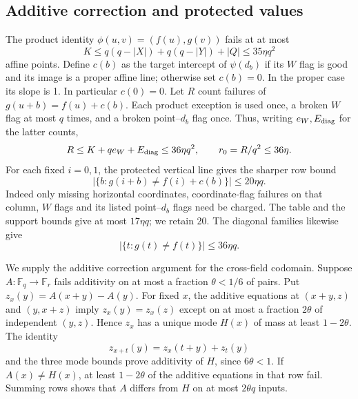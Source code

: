 \documentclass[11pt]{article}
\newcommand{\F}{\mathbb F}
\begin{document}
\subsection{Additive correction and protected values}
The product identity $\phi(u,v)=(f(u),g(v))$ fails at at most
\[
 K\leq q(q-|X|)+q(q-|Y|)+|Q|\leq35\eta q^2
\]
affine points. Define $c(b)$ as the target intercept of $\psi(d_b)$ if
its $W$ flag is good and its image is a proper affine line; otherwise set
$c(b)=0$. In the proper case its slope is 1. In particular $c(0)=0$.
Let $R$ count failures of $g(u+b)=f(u)+c(b)$. Each product exception is
used once, a broken $W$ flag at most $q$ times, and a broken
point--$d_b$ flag once. Thus, writing $e_W,E_{\rm diag}$ for the latter
counts,
\begin{equation}\label{pexidererror}
 R\leq K+qe_W+E_{\rm diag}\leq36\eta q^2,\qquad r_0=R/q^2\leq36\eta.
\end{equation}
For each fixed $i=0,1$, the protected vertical line gives the sharper
row bound
\begin{equation}\label{fixedrow}
 |\{b:g(i+b)\ne f(i)+c(b)\}|\leq20\eta q.
\end{equation}
Indeed only missing horizontal coordinates, coordinate-flag failures on
that column, $W$ flags and its listed point--$d_b$ flags need be charged.
The table and the support bounds give at most $17\eta q$; we retain 20.
The diagonal families likewise give
\begin{equation}\label{diagonalagree}
 |\{t:g(t)\ne f(t)\}|\leq36\eta q.
\end{equation}

We supply the additive correction argument for the cross-field codomain.
Suppose $A:\F_q\to\F_r$ fails additivity on at most a fraction
$\theta<1/6$ of pairs. Put $z_x(y)=A(x+y)-A(y)$. For fixed $x$, the
additive equations at $(x+y,z)$ and $(y,x+z)$ imply $z_x(y)=z_x(z)$
except on at most a fraction $2\theta$ of independent $(y,z)$. Hence
$z_x$ has a unique mode $H(x)$ of mass at least $1-2\theta$.
The identity
\[
 z_{x+t}(y)=z_x(t+y)+z_t(y)
\]
and the three mode bounds prove additivity of $H$, since $6\theta<1$.
If $A(x)\ne H(x)$, at least $1-2\theta$ of the additive equations in
that row fail. Summing rows shows that $A$ differs from $H$ on at most
$2\theta q$ inputs.
\end{document}
